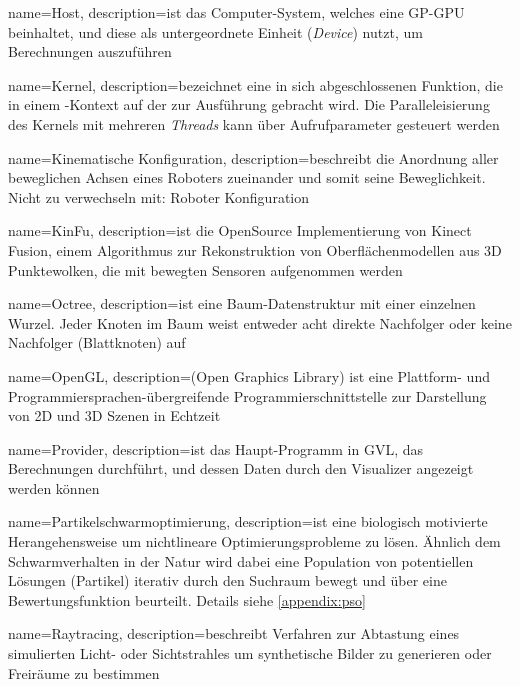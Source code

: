 {
	name=Host,
	description={ist das Computer-System, welches eine GP-GPU beinhaltet, und diese als untergeordnete Einheit (\textit{Device}) nutzt, um  Berechnungen auszuführen}
}

{
	name=Kernel,
	description={bezeichnet eine in sich abgeschlossenen Funktion, die in einem -Kontext auf der  zur Ausführung gebracht wird. Die Paralleleisierung des Kernels mit mehreren \textit{Threads} kann über Aufrufparameter gesteuert werden}
}

{
	name=Kinematische Konfiguration,
	description={beschreibt die Anordnung aller beweglichen Achsen eines Roboters zueinander und somit seine Beweglichkeit. Nicht zu verwechseln mit: \Gls{Roboter Konfiguration}}
}

{
	name=KinFu,
	description={ist die OpenSource Implementierung von Kinect Fusion, einem Algorithmus zur Rekonstruktion von Oberflächenmodellen aus 3D Punktewolken, die mit bewegten Sensoren aufgenommen werden}
}

{
	name=Octree,
	description={ist eine Baum-Datenstruktur mit einer einzelnen Wurzel. Jeder Knoten im Baum weist entweder acht direkte Nachfolger oder keine Nachfolger (Blattknoten) auf}
}

{
	name=OpenGL,
	description={(Open Graphics Library) ist eine Plattform- und Programmiersprachen-übergreifende Programmierschnittstelle zur Darstellung von 2D und 3D Szenen in Echtzeit}
}

{
	name=Provider,
	description={ist das Haupt-Programm in \Gls{GVL}, das Berechnungen durchführt, und dessen Daten durch den \Gls{Visualizer} angezeigt werden können}
}

{
  name=Partikelschwarmoptimierung,
  description={ist eine biologisch motivierte Herangehensweise um nichtlineare Optimierungsprobleme zu lösen. Ähnlich dem Schwarmverhalten in der Natur wird dabei eine Population von potentiellen Lösungen (Partikel) iterativ durch den Suchraum bewegt und über eine Bewertungsfunktion beurteilt. Details siehe  \cref{appendix:pso}}
}

{
	name=Raytracing,
	description={beschreibt Verfahren zur Abtastung eines simulierten Licht- oder Sichtstrahles um synthetische Bilder zu generieren oder Freiräume zu bestimmen}
}

